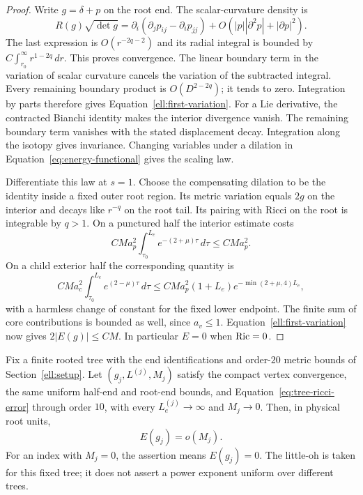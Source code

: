 \begin{proof}
Write $g=\delta+p$ on the root end.  The scalar-curvature density is
\[
 R(g)\sqrt{\det g}=
 \partial_i(\partial_jp_{ij}-\partial_ip_{jj})+
 O(|p||\partial^2p|+|\partial p|^2).
\]
The last expression is $O(r^{-2q-2})$ and its radial integral is
bounded by $C\int_{r_0}^\infty r^{1-2q}\,dr$.  This proves convergence.
The linear boundary term in the variation of scalar curvature
cancels the variation of the subtracted integral.  Every remaining
boundary product is $O(D^{2-2q})$; it tends to zero.  Integration by
parts therefore gives Equation~\eqref{ell:first-variation}.
For a Lie derivative, the contracted Bianchi identity makes the
interior divergence vanish.  The remaining boundary term vanishes
with the stated displacement decay.  Integration along the isotopy
gives invariance.  Changing variables under a dilation in
Equation~\eqref{eq:energy-functional} gives the scaling law.

Differentiate this law at $s=1$.  Choose the compensating dilation
to be the identity inside a fixed outer root region.  Its metric
variation equals $2g$ on the interior and decays like $r^{-q}$ on
the root tail.  Its pairing with Ricci on the root is integrable
by $q>1$.  On a punctured half the interior estimate costs
\[
 CM a_p^2\int_{\tau_0}^{L_e}e^{-(2+\mu)\tau}\,d\tau\le CM a_p^2.
\]
On a child exterior half the corresponding quantity is
\[
 CM a_c^2\int_{\tau_0}^{L_e}e^{(2-\mu)\tau}\,d\tau
 \le CM a_p^2(1+L_e)e^{-\min(2+\mu,4)L_e},
\]
with a harmless change of constant for the fixed lower endpoint.
The finite sum of core contributions is bounded as well, since
$a_v\le1$.  Equation~\eqref{ell:first-variation} now gives
$2|E(g)|\le CM$.  In particular $E=0$ when $\operatorname{Ric}=0$.
\end{proof}

\begin{theorem}
\label{thm:tree-inequality}
Fix a finite rooted tree with the end identifications and order-$20$ metric bounds of Section~\ref{ell:setup}. Let $(g_j,L^{(j)},M_j)$ satisfy the compact vertex convergence, the same uniform half-end and root-end bounds, and Equation~\eqref{eq:tree-ricci-error} through order $10$, with every $L_e^{(j)}\to\infty$ and $M_j\to0$. Then, in physical root units,
\begin{equation}
                         E(g_j)=o(M_j).
 \label{ell:little-oh}
\end{equation}
For an index with $M_j=0$, the assertion means $E(g_j)=0$. The little-oh is taken for this fixed tree; it does not assert a power exponent uniform over different trees.
\end{theorem}

